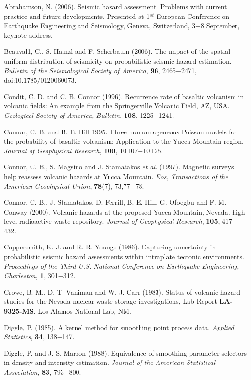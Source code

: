 \documentclass[10pt]{article}
\begin{document}
\begin{thebibliography}{99}
\small{
Abrahamson, N. (2006). Seismic hazard assessment: Problems with current practice and future developments. Presented at 1$^{st}$ European Conference on Earthquake Engineering and Seismology, Geneva, Switzerland, 3$-$8 September, keynote address.

Beauval1, C., S. Hainzl and F. Scherbaum (2006). The impact of the spatial uniform distribution of seismicity on probabilistic seismic-hazard estimation. {\it Bulletin of the Seismological Society of America},  {\bf96}, 2465$-$2471, doi:10.1785/0120060073.

Condit, C. D. and C. B. Connor (1996). Recurrence rate of basaltic volcanism in volcanic fields: An example from the Springerville Volcanic Field, AZ, USA. {\it Geological Society of America, Bulletin}, {\bf 108}, 1225$-$1241.

Connor, C. B. and B. E. Hill 1995. Three nonhomogeneous Poisson models for the probability of basaltic volcanism: Application to the Yucca Mountain region. {\it Journal of Geophysical Research}, {\bf 100}, 10\,107$-$10\,125.

Connor, C. B., S. Magsino and J. Stamatakos {\it et al.} (1997). Magnetic surveys help reassess volcanic hazards at Yucca Mountain. {\it Eos, Transactions of the American Geophysical Union}, {\bf 78}(7), 73,77$-$78.

Connor, C. B., J. Stamatakos, D. Ferrill, B. E. Hill, G. Ofoegbu and F. M. Conway (2000). Volcanic hazards at the proposed Yucca Mountain, Nevada, high-level radioactive waste repository. {\it Journal of Geophysical Research}, {\bf 105}, 417$-$432.

Coppersmith, K. J. and R. R. Youngs (1986). Capturing uncertainty in probabilistic seismic hazard assessments within intraplate tectonic environments. {\it Proceedings of the Third U.S. National Conference on Earthquake Engineering, Charleston}, {\bf 1}, 301$-$312.

Crowe, B. M., D. T. Vaniman and W. J. Carr (1983). Status of volcanic hazard studies for the Nevada nuclear waste storage investigations, Lab Report {\bf LA-9325-MS}. Los Alamos National Lab, NM.

Diggle, P. (1985). A kernel method for smoothing point process data. {\it  Applied Statistics}, {\bf 34}, 138$-$147.

Diggle, P. and J. S. Marron (1988). Equivalence of smoothing parameter selectors in density and intensity estimation. {\it Journal of the American Statistical Association}, {\bf 83}, 793$-$800.

}
\end{thebibliography}
\end{document}

